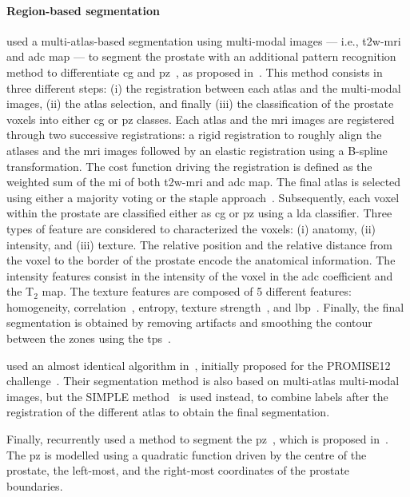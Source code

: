 \paragraph{Region-based segmentation}
\citeauthor{Litjens2012} used a multi-atlas-based segmentation using multi-modal images --- i.e., \ac{t2w}-\ac{mri} and \ac{adc} map --- to segment the prostate with an additional pattern recognition method to differentiate \ac{cg} and \ac{pz}~\cite{Litjens2012}, as proposed in~\cite{Litjens2012a}.
This method consists in three different steps: (i) the registration between each atlas and the multi-modal images, (ii) the atlas selection, and finally (iii) the classification of the prostate voxels into either \ac{cg} or \ac{pz} classes.
Each atlas and the \ac{mri} images are registered through two successive registrations: a rigid registration to roughly align the atlases and the \ac{mri} images followed by an elastic registration using a B-spline transformation.
The cost function driving the registration is defined as the weighted sum of the \ac{mi} of both \ac{t2w}-\ac{mri} and \ac{adc} map.
The final atlas is selected using either a majority voting or the \ac{staple} approach~\cite{Warfield2004}.
Subsequently, each voxel within the prostate are classified either as \ac{cg} or \ac{pz} using a \ac{lda} classifier.
Three types of feature are considered to characterized the voxels: (i) anatomy, (ii) intensity, and (iii) texture.
The relative position and the relative distance from the voxel to the border of the prostate encode the anatomical information.
The intensity features consist in the intensity of the voxel in the \ac{adc} coefficient and the T$_2$ map.
The texture features are composed of 5 different features: homogeneity, correlation~\cite{Amadasun1989}, entropy, texture strength~\cite{Li2005a}, and \ac{lbp}~\cite{Ojala1996}.
Finally, the final segmentation is obtained by removing artifacts and smoothing the contour between the zones using the \ac{tps}~\cite{Bookstein1989}.

\citeauthor{Litjens2014} used an almost identical algorithm in~\cite{Litjens2014}, initially proposed for the PROMISE12 challenge~\cite{Litjens2014a}.
Their segmentation method is also based on multi-atlas multi-modal images, but the SIMPLE method~\cite{langerak2010label} is used instead, to combine labels after the registration of the different atlas to obtain the final segmentation.
 
Finally, \citeauthor{rampun2016computerb} recurrently used a method to segment the \ac{pz}~\cite{rampun2015classifying,rampun2015computer,rampun2016computer,rampun2016computerb,rampun2016quantitative}, which is proposed in~\cite{rampun2014detection}.
The \ac{pz} is modelled using a quadratic function driven by the centre of the prostate, the left-most, and the right-most coordinates of the prostate boundaries.

